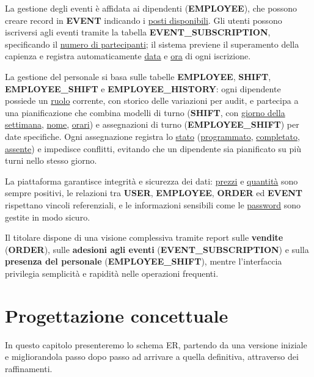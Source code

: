 \documentclass[a4paper,12pt]{report}
\begin{document}
La gestione degli eventi è affidata ai dipendenti
(\textbf{EMPLOYEE}), che possono creare record in \textbf{EVENT}
indicando i \underline{posti disponibili}. Gli utenti possono
iscriversi agli eventi tramite la tabella
\textbf{EVENT\_SUBSCRIPTION}, specificando il \underline{numero di
partecipanti}; il sistema previene il superamento della capienza e
registra automaticamente \underline{data} e \underline{ora} di ogni iscrizione.

La gestione del personale si basa sulle tabelle \textbf{EMPLOYEE},
\textbf{SHIFT}, \textbf{EMPLOYEE\_SHIFT} e
\textbf{EMPLOYEE\_HISTORY}: ogni dipendente possiede un
\underline{ruolo} corrente, con storico delle variazioni per audit, e
partecipa a una pianificazione che combina modelli di turno
(\textbf{SHIFT}, con \underline{giorno della settimana},
\underline{nome}, \underline{orari}) e assegnazioni di turno
(\textbf{EMPLOYEE\_SHIFT}) per date specifiche. Ogni assegnazione
registra lo \underline{stato} (\underline{programmato},
\underline{completato}, \underline{assente}) e impedisce conflitti,
evitando che un dipendente sia pianificato su più turni nello stesso giorno.

La piattaforma garantisce integrità e sicurezza dei dati:
\underline{prezzi} e \underline{quantità} sono sempre positivi, le
relazioni tra \textbf{USER}, \textbf{EMPLOYEE}, \textbf{ORDER} ed
\textbf{EVENT} rispettano vincoli referenziali, e le informazioni
sensibili come le \underline{password} sono gestite in modo sicuro.

Il titolare dispone di una visione complessiva tramite report sulle
\textbf{vendite} (\textbf{ORDER}), sulle \textbf{adesioni agli
eventi} (\textbf{EVENT\_SUBSCRIPTION}) e sulla \textbf{presenza del
personale} (\textbf{EMPLOYEE\_SHIFT}), mentre l'interfaccia
privilegia semplicità e rapidità nelle operazioni frequenti.

\chapter{Progettazione concettuale}
In questo capitolo presenteremo lo schema ER, partendo da una
versione iniziale e migliorandola passo dopo passo ad arrivare a
quella definitiva, attraverso dei raffinamenti.
\end{document}
